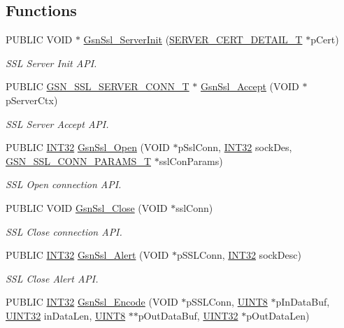 \subsection*{Functions}
\begin{DoxyCompactItemize}
\item 
PUBLIC VOID $\ast$ \hyperlink{a00674_ga006730269e57e14d7d8db08d92c6a66f}{GsnSsl\_\-ServerInit} (\hyperlink{a00459}{SERVER\_\-CERT\_\-DETAIL\_\-T} $\ast$pCert)
\begin{DoxyCompactList}\small\item\em SSL Server Init API. \end{DoxyCompactList}\item 
PUBLIC \hyperlink{a00245}{GSN\_\-SSL\_\-SERVER\_\-CONN\_\-T} $\ast$ \hyperlink{a00674_ga1a963b6c25ebc6d49fc74042b6a04fdc}{GsnSsl\_\-Accept} (VOID $\ast$pServerCtx)
\begin{DoxyCompactList}\small\item\em SSL Server Accept API. \end{DoxyCompactList}\item 
PUBLIC \hyperlink{a00660_ga63021d67d54286c2163bcdb43a6f2569}{INT32} \hyperlink{a00674_gae142357dbc08534b840fb7cb3a8ef918}{GsnSsl\_\-Open} (VOID $\ast$pSslConn, \hyperlink{a00660_ga63021d67d54286c2163bcdb43a6f2569}{INT32} sockDes, \hyperlink{a00242}{GSN\_\-SSL\_\-CONN\_\-PARAMS\_\-T} $\ast$sslConParams)
\begin{DoxyCompactList}\small\item\em SSL Open connection API. \end{DoxyCompactList}\item 
PUBLIC VOID \hyperlink{a00674_gadfc449eccdabf03e53cfad9ab4ec84a9}{GsnSsl\_\-Close} (VOID $\ast$sslConn)
\begin{DoxyCompactList}\small\item\em SSL Close connection API. \end{DoxyCompactList}\item 
PUBLIC \hyperlink{a00660_ga63021d67d54286c2163bcdb43a6f2569}{INT32} \hyperlink{a00674_ga6b68d0db3b129389d791294c46c0bdc8}{GsnSsl\_\-Alert} (VOID $\ast$pSSLConn, \hyperlink{a00660_ga63021d67d54286c2163bcdb43a6f2569}{INT32} sockDesc)
\begin{DoxyCompactList}\small\item\em SSL Close Alert API. \end{DoxyCompactList}\item 
PUBLIC \hyperlink{a00660_ga63021d67d54286c2163bcdb43a6f2569}{INT32} \hyperlink{a00674_ga0a0b2a99da357ea291fe513d0d7f9e62}{GsnSsl\_\-Encode} (VOID $\ast$pSSLConn, \hyperlink{a00660_gab27e9918b538ce9d8ca692479b375b6a}{UINT8} $\ast$pInDataBuf, \hyperlink{a00660_gae1e6edbbc26d6fbc71a90190d0266018}{UINT32} inDataLen, \hyperlink{a00660_gab27e9918b538ce9d8ca692479b375b6a}{UINT8} $\ast$$\ast$pOutDataBuf, \hyperlink{a00660_gae1e6edbbc26d6fbc71a90190d0266018}{UINT32} $\ast$pOutDataLen)
$$
\end{DoxyCompactItemize}
